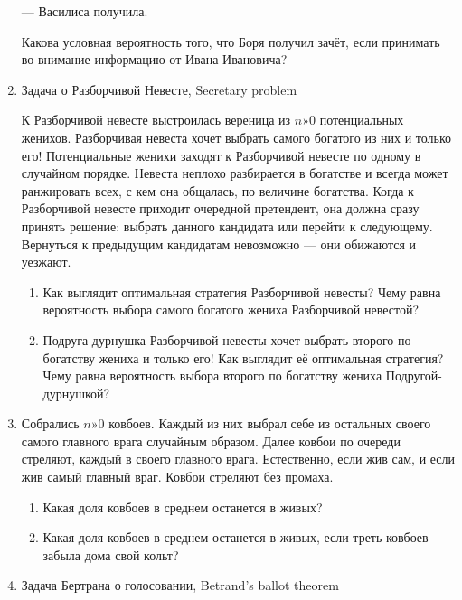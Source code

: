 \documentclass[nobib]{tufte-handout}
\begin{document}
\begin{enumerate}
--- Василиса получила.

Какова условная вероятность того, что Боря получил зачёт, если принимать во внимание информацию от Ивана Ивановича?

\item Задача о Разборчивой Невесте, Secretary problem 

К Разборчивой невесте выстроилась вереница из $n»0$ потенциальных женихов.   Разборчивая невеста хочет выбрать самого богатого из них и только его! Потенциальные женихи заходят к Разборчивой невесте по одному в случайном порядке. Невеста неплохо разбирается в богатстве и всегда может ранжировать всех, с кем она общалась, по величине богатства. Когда к Разборчивой невесте приходит очередной претендент, она должна сразу принять решение: выбрать данного кандидата или перейти к следующему. Вернуться к предыдущим кандидатам невозможно --- они обижаются и уезжают.

\begin{enumerate}
\item Как выглядит оптимальная стратегия Разборчивой невесты? Чему равна вероятность выбора самого богатого жениха Разборчивой невестой?
\item Подруга-дурнушка Разборчивой невесты хочет выбрать второго по богатству жениха и только его!  Как выглядит её оптимальная стратегия? Чему равна вероятность выбора второго по богатству жениха Подругой-дурнушкой?
\end{enumerate}

\item Собрались $n»0$ ковбоев. Каждый из них выбрал себе из остальных своего самого главного врага случайным образом. Далее ковбои по очереди стреляют, каждый в своего главного врага. Естественно, если жив сам, и если жив самый главный враг. Ковбои стреляют без промаха. 
\begin{enumerate}
\item Какая доля ковбоев в среднем останется в живых?
\item Какая доля ковбоев в среднем останется в живых, если треть ковбоев забыла дома свой кольт?
\end{enumerate}

\item Задача Бертрана о голосовании, Betrand's ballot theorem


\end{enumerate}
\end{document}
